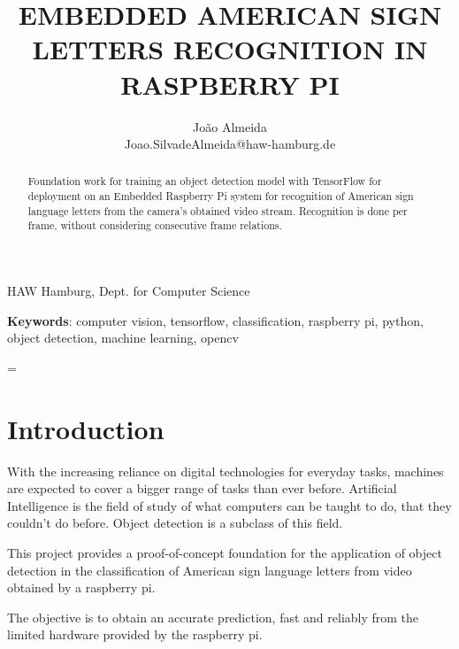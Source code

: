 \documentclass[10pt]{article}
\title{\renewcommand{\baselinestretch}{1.17}\normalsize\bf%
\uppercase{Embedded American Sign Letters Recognition in  Raspberry Pi}
}
\author{%
João Almeida\\
Joao.SilvadeAlmeida@haw-hamburg.de
}
\begin{document}
\date{}

\maketitle

\vspace{-0.5cm}

\begin{center}
{\footnotesize 
HAW Hamburg, Dept. for Computer Science \\
}
\end{center}

\bigskip
\noindent
\begin{abstract}
	Foundation work for training an object detection model with TensorFlow for deployment on an Embedded Raspberry Pi system for recognition of American sign language letters from the camera's obtained video stream. Recognition is done per frame, without considering consecutive frame relations.
\end{abstract}

\medskip
\noindent
{\small{\bf Keywords}{:} 
computer vision, tensorflow, classification, raspberry pi, python, object detection, machine learning, opencv
}

\baselineskip=\normalbaselineskip

\pagebreak
\tableofcontents
\pagebreak

\section{Introduction}\label{sec:1}

	With the increasing reliance on digital technologies for everyday tasks, machines are expected to cover a bigger range of tasks than ever before. Artificial Intelligence is the field of study of what computers can be taught to do, that they couldn't do before. Object detection is a subclass of this field.

	This project provides a proof-of-concept foundation for the application of object detection in the classification of American sign language letters from video obtained by a raspberry pi. 

	The objective is to obtain an accurate prediction, fast and reliably from the limited hardware provided by the raspberry pi.
\end{document}
